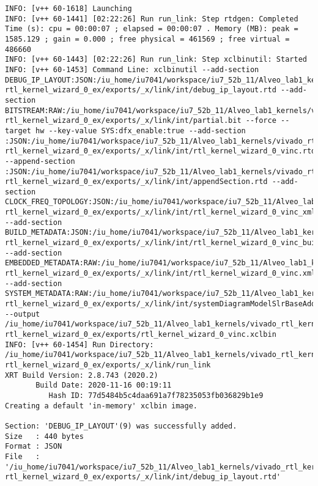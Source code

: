 \begin{lstlisting}[label=code:log_file, caption=Содержимое log-файла, basicstyle=\tiny]
INFO: [v++ 60-1618] Launching 
INFO: [v++ 60-1441] [02:22:26] Run run_link: Step rtdgen: Completed
Time (s): cpu = 00:00:07 ; elapsed = 00:00:07 . Memory (MB): peak = 1585.129 ; gain = 0.000 ; free physical = 461569 ; free virtual = 486660
INFO: [v++ 60-1443] [02:22:26] Run run_link: Step xclbinutil: Started
INFO: [v++ 60-1453] Command Line: xclbinutil --add-section DEBUG_IP_LAYOUT:JSON:/iu_home/iu7041/workspace/iu7_52b_11/Alveo_lab1_kernels/vivado_rtl_kernel/ rtl_kernel_wizard_0_ex/exports/_x/link/int/debug_ip_layout.rtd --add-section BITSTREAM:RAW:/iu_home/iu7041/workspace/iu7_52b_11/Alveo_lab1_kernels/vivado_rtl_kernel/ rtl_kernel_wizard_0_ex/exports/_x/link/int/partial.bit --force --target hw --key-value SYS:dfx_enable:true --add-section :JSON:/iu_home/iu7041/workspace/iu7_52b_11/Alveo_lab1_kernels/vivado_rtl_kernel/ rtl_kernel_wizard_0_ex/exports/_x/link/int/rtl_kernel_wizard_0_vinc.rtd --append-section :JSON:/iu_home/iu7041/workspace/iu7_52b_11/Alveo_lab1_kernels/vivado_rtl_kernel/ rtl_kernel_wizard_0_ex/exports/_x/link/int/appendSection.rtd --add-section CLOCK_FREQ_TOPOLOGY:JSON:/iu_home/iu7041/workspace/iu7_52b_11/Alveo_lab1_kernels/vivado_rtl_kernel/ rtl_kernel_wizard_0_ex/exports/_x/link/int/rtl_kernel_wizard_0_vinc_xml.rtd --add-section BUILD_METADATA:JSON:/iu_home/iu7041/workspace/iu7_52b_11/Alveo_lab1_kernels/vivado_rtl_kernel/ rtl_kernel_wizard_0_ex/exports/_x/link/int/rtl_kernel_wizard_0_vinc_build.rtd --add-section EMBEDDED_METADATA:RAW:/iu_home/iu7041/workspace/iu7_52b_11/Alveo_lab1_kernels/vivado_rtl_kernel/ rtl_kernel_wizard_0_ex/exports/_x/link/int/rtl_kernel_wizard_0_vinc.xml --add-section SYSTEM_METADATA:RAW:/iu_home/iu7041/workspace/iu7_52b_11/Alveo_lab1_kernels/vivado_rtl_kernel/ rtl_kernel_wizard_0_ex/exports/_x/link/int/systemDiagramModelSlrBaseAddress.json --output /iu_home/iu7041/workspace/iu7_52b_11/Alveo_lab1_kernels/vivado_rtl_kernel/ rtl_kernel_wizard_0_ex/exports/rtl_kernel_wizard_0_vinc.xclbin
INFO: [v++ 60-1454] Run Directory: /iu_home/iu7041/workspace/iu7_52b_11/Alveo_lab1_kernels/vivado_rtl_kernel/ rtl_kernel_wizard_0_ex/exports/_x/link/run_link
XRT Build Version: 2.8.743 (2020.2)
       Build Date: 2020-11-16 00:19:11
          Hash ID: 77d5484b5c4daa691a7f78235053fb036829b1e9
Creating a default 'in-memory' xclbin image.

Section: 'DEBUG_IP_LAYOUT'(9) was successfully added.
Size   : 440 bytes
Format : JSON
File   : '/iu_home/iu7041/workspace/iu7_52b_11/Alveo_lab1_kernels/vivado_rtl_kernel/ rtl_kernel_wizard_0_ex/exports/_x/link/int/debug_ip_layout.rtd'


\end{lstlisting}
